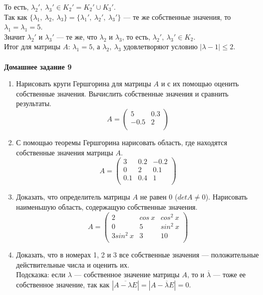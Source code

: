 \documentclass[12pt]{article}
\theoremstyle{definition}
\numberwithin{equation}{section}
\begin{document}
	То есть, $\lambda_2',~\lambda_3'\in K_2'=K_2'\cup K_3'$.\\
	Так как $\{\lambda_1,~\lambda_2,~\lambda_3\}=\{\lambda_1',~\lambda_2',~\lambda_3'\}$ --- те же собственные значения, то $\lambda_1=\lambda_1=5$.\\
	Значит $\lambda_2'$ и $\lambda_3'$ --- те же, что $\lambda_2$ и $\lambda_3$, то есть, $\lambda_2',~\lambda_3'\in K_2$.\\
	Итог для матрицы $A$: $\lambda_1=5$, а $\lambda_2,~\lambda_3$ удовлетворяют условию $|\lambda-1|\leqslant 2$.\\ \\
	\textbf{Домашнее задание 9}\begin{enumerate}
		\item Нарисовать круги Гершгорина для матрицы $A$ и с их помощью оценить собственные значения. Вычислить собственные значения и сравнить результаты.
		\[A = \begin{pmatrix}
		5 & 0.3\\
		-0.5 & 2\\
		\end{pmatrix}\]
		\item С помощью теоремы Гершгорина нарисовать область, где находятся собственные значения матрицы $A$.
		\[A = \begin{pmatrix}
		3 & 0.2 & -0.2\\
		0 & 2 & 0.1\\
		0.1 & 0.4 & 1\\
		\end{pmatrix}\]
		\item Доказать, что определитель матрицы $A$ не равен 0 ($detA\neq 0$). Нарисовать наименьшую область, содержащую собственные значения.
		\[A = \begin{pmatrix}
		2 & cos~x & cos^2~x\\
		0 & 5 & sin^2~x\\
		3sin^2~x & 3 & 10\\
		\end{pmatrix}\]
		\item Доказать, что в номерах 1, 2 и 3 все собственные значения --- положительные действительные числа и оценить их.\\
		Подсказка: если $\lambda$ --- собственное значение матрицы $A$, то и $\overline \lambda$ --- тоже ее собственное значение, так как $|\overline{A-\lambda E}|=|A-\overline\lambda E|=0$.
	\end{enumerate}
	~\\
\end{document}
